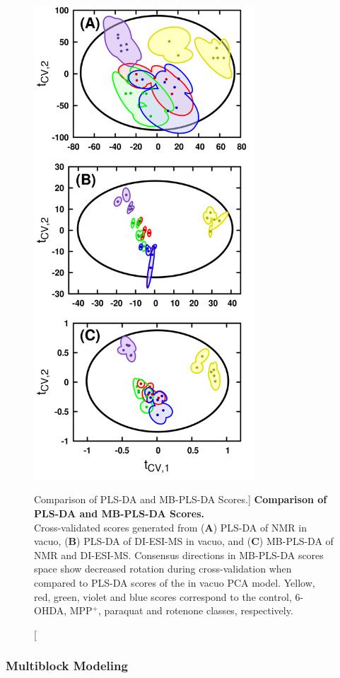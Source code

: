 \begin{figure}
\includegraphics[width=3.25in]{figs/apps/10-mbpls-t.png}
\caption
      [Comparison of PLS-DA and MB-PLS-DA Scores.]{
  {\bf Comparison of PLS-DA and MB-PLS-DA Scores.}
  \\
  Cross-validated scores generated from ({\bf A}) PLS-DA of \hnmr{} NMR in
  vacuo, ({\bf B}) PLS-DA of DI-ESI-MS in vacuo, and ({\bf C}) MB-PLS-DA of
  \hnmr{} NMR and DI-ESI-MS. Consensus directions in MB-PLS-DA scores space
  show decreased rotation during cross-validation when compared to PLS-DA
  scores of the in vacuo PCA model. Yellow, red, green, violet and blue scores
  correspond to the control, 6-OHDA, MPP$^+$, paraquat and rotenone classes,
  respectively.
}
\label{figure.4.10}
\end{figure}

\subsubsection{Multiblock Modeling}

